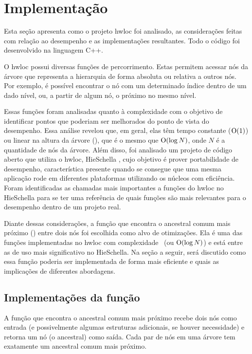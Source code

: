 \chapter{Implementação}

Esta seção apresenta como o projeto hwloc foi analisado, as considerações feitas com relação ao desempenho e as implementações resultantes.
Todo o código foi desenvolvido na linguagem C++.

O hwloc possui diversas funções de percorrimento.
Estas permitem acessar nós da árvore que representa a hierarquia de forma absoluta ou relativa a outros nós.
Por exemplo, é possível encontrar o nó com um determinado índice dentro de um dado nível,
ou, a partir de algum nó, o próximo no mesmo nível.

Essas funções foram analisadas quanto à complexidade com o objetivo de identificar pontos que poderiam ser melhorados do ponto de vista do desempenho.
Essa análise revelou que, em geral, elas têm tempo constante ($\operatorname{O}(1)$) ou linear na altura da árvore (\Oalt), que é o mesmo que $\operatorname{O}(\log N)$, onde $N$ é a quantidade de nós da árvore.
Além disso, foi analisado um projeto de código aberto que utiliza o hwloc, HieSchella \cite{HieSchella},
cujo objetivo é prover portabilidade de desempenho, característica presente quando se consegue que
uma mesma aplicação rode em diferentes plataformas utilizando os núcleos com eficiência.
Foram identificadas as chamadas mais importantes a funções do hwloc no HieSchella para se ter uma referência
de quais funções são mais relevantes para o desempenho dentro de um projeto real.

Diante dessas considerações, a função que encontra o ancestral comum mais próximo (\fACMP) entre dois nós foi escolhida como alvo de otimizações.
Ela é uma das funções implementadas no hwloc com complexidade \Oalt\ (ou $\operatorname{O}(\log N)$) e está entre as de uso mais significativo no HieSchella.
Na seção a seguir, será discutido como essa função poderia ser implementada de forma mais eficiente e quais as implicações de diferentes abordagens.


\section{Implementações da função \fACMP}

A função que encontra o ancestral comum mais próximo recebe dois nós como entrada (e possivelmente algumas estruturas adicionais, se houver necessidade)
e retorna um nó (o ancestral) como saída.
Cada par de nós em uma árvore tem exatamente um ancestral comum mais próximo.

